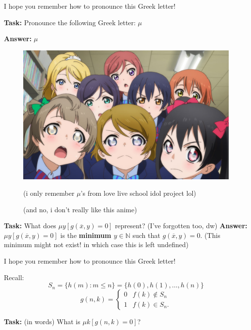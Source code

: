 \documentclass{beamer}
\begin{document}
\begin{frame}{I hope you remember how to pronounce this Greek letter!}

\textbf{Task:} Pronounce the following Greek letter: $\mu$

\textbf{Answer:} $\mu$ 

\begin{figure}[h]
\centering
\includegraphics[scale=0.1]{img/muse.jpg}

(i only remember $\mu$'s from love live school idol project lol)

(and no, i don't really like this anime)
\end{figure}

\textbf{Task:} What does $\mu y[g(\overline{x}, y) = 0]$ represent? (I've forgotten too, dw)
\textbf{Answer:} $\mu y[g(\overline{x}, y) = 0]$ is the \textbf{minimum $y \in \mathbb N$} such that $g(\overline{x}, y) = 0$. (This minimum might not exist! in which case this is left undefined)

\end{frame}

\begin{frame}{I hope you remember how to pronounce this Greek letter!}

Recall: $$S_n = \{h(m): m \leq n\} = \{h(0), h(1), \ldots, h(n)\}$$ $$g(n, k) = \begin{cases}
0 & f(k) \notin S_n\\
1 & f(k) \in S_n.
\end{cases}$$

\textbf{Task:} (in words) What is $\mu k[g(n, k) = 0]$?

\end{frame}
\end{document}
